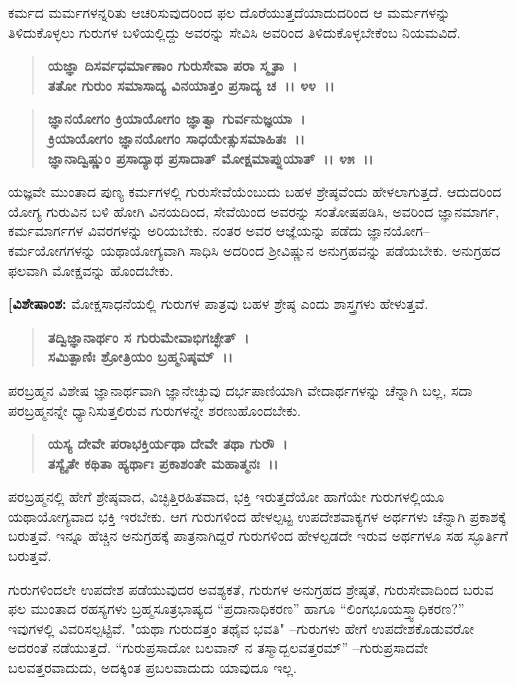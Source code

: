 ಕರ್ಮದ ಮರ್ಮಗಳನ್ನರಿತು ಆಚರಿಸುವುದರಿಂದ ಫಲ ದೊರೆಯುತ್ತದೆಯಾದುದರಿಂದ ಆ ಮರ್ಮಗಳನ್ನು ತಿಳಿದುಕೊಳ್ಳಲು ಗುರುಗಳ ಬಳಿಯಲ್ಲಿದ್ದು ಅವರನ್ನು ಸೇವಿಸಿ ಅವರಿಂದ ತಿಳಿದುಕೊಳ್ಳಬೇಕೆಂಬ ನಿಯಮವಿದೆ.

\begin{verse}
\textbf{ಯಜ್ಞಾ ದಿಸರ್ವಧರ್ಮಾಣಾಂ ಗುರುಸೇವಾ ಪರಾ ಸ್ಮೃತಾ~।}\\\textbf{ತತೋ ಗುರುಂ ಸಮಾಸಾದ್ಯ ವಿನಯಾತ್ತಂ ಪ್ರಸಾದ್ಯ ಚ~।। ೪೪~।। }
\end{verse}

\begin{verse}
\textbf{ಜ್ಞಾನಯೋಗಂ ಕ್ರಿಯಾಯೋಗಂ ಜ್ಞಾತ್ವಾ ಗುರ್ವನುಜ್ಞಯಾ~।}\\\textbf{ಕ್ರಿಯಾಯೋಗಂ ಜ್ಞಾನಯೋಗಂ ಸಾಧಯೇತ್ಸುಸಮಾಹಿತಃ~।।}\\\textbf{ಜ್ಞಾನಾದ್ವಿಷ್ಣುಂ ಪ್ರಸಾದ್ಯಾಥ ಪ್ರಸಾದಾತ್ ಮೋಕ್ಷಮಾಪ್ನುಯಾತ್~।। ೪೫~।।}
\end{verse}

ಯಜ್ಞವೇ ಮುಂತಾದ ಪುಣ್ಯ ಕರ್ಮಗಳಲ್ಲಿ ಗುರುಸೇವೆಯೆಂಬುದು ಬಹಳ ಶ್ರೇಷ್ಠವೆಂದು ಹೇಳಲಾಗುತ್ತದೆ. ಆದುದರಿಂದ ಯೋಗ್ಯ ಗುರುವಿನ ಬಳಿ ಹೋಗಿ ವಿನಯದಿಂದ, ಸೇವೆಯಿಂದ ಅವರನ್ನು ಸಂತೋಷಪಡಿಸಿ, ಅವರಿಂದ ಜ್ಞಾನಮಾರ್ಗ, ಕರ್ಮಮಾರ್ಗಗಳ ವಿವರಗಳನ್ನು ಅರಿಯಬೇಕು. ನಂತರ ಅವರ ಆಜ್ಞೆಯನ್ನು ಪಡೆದು ಜ್ಞಾನಯೋಗ–ಕರ್ಮಯೋಗಗಳನ್ನು ಯಥಾಯೋಗ್ಯವಾಗಿ ಸಾಧಿಸಿ ಅದರಿಂದ ಶ‍್ರೀವಿಷ್ಣುನ ಅನುಗ್ರಹವನ್ನು ಪಡೆಯಬೇಕು. ಅನುಗ್ರಹದ ಫಲವಾಗಿ ಮೋಕ್ಷವನ್ನು ಹೊಂದಬೇಕು.

\textbf{[ವಿಶೇಷಾಂಶ: }ಮೋಕ್ಷಸಾಧನೆಯಲ್ಲಿ ಗುರುಗಳ ಪಾತ್ರವು ಬಹಳ ಶ್ರೇಷ್ಠ ಎಂದು ಶಾಸ್ತ್ರಗಳು ಹೇಳುತ್ತವೆ.

\begin{verse}
\textbf{ತದ್ವಿಜ್ಞಾನಾರ್ಥಂ ಸ ಗುರುಮೇವಾಭಿಗಚ್ಛೇತ್~।}\\\textbf{ಸಮಿತ್ಪಾಣಿಃ ಶ್ರೋತ್ರಿಯಂ ಬ್ರಹ್ಮನಿಷ್ಠಮ್~।।} 
\end{verse}

ಪರಬ್ರಹ್ಮನ ವಿಶೇಷ ಜ್ಞಾನಾರ್ಥವಾಗಿ ಜ್ಞಾನೇಚ್ಛುವು ದರ್ಭಪಾಣಿಯಾಗಿ ವೇದಾರ್ಥಗಳನ್ನು ಚೆನ್ನಾಗಿ ಬಲ್ಲ, ಸದಾ ಪರಬ್ರಹ್ಮನನ್ನೇ ಧ್ಯಾನಿಸುತ್ತಲಿರುವ ಗುರುಗಳನ್ನೇ ಶರಣುಹೊಂದಬೇಕು.

\begin{verse}
\textbf{ಯಸ್ಯ ದೇವೇ ಪರಾಭಕ್ತಿರ್ಯಥಾ ದೇವೇ ತಥಾ ಗುರೌ~।}\\\textbf{ತಸ್ಯೈತೇ ಕಥಿತಾ ಹ್ಯರ್ಥಾಃ ಪ್ರಕಾಶಂತೇ ಮಹಾತ್ಮನಃ~।।} 
\end{verse}

ಪರಬ್ರಹ್ಮನಲ್ಲಿ ಹೇಗೆ ಶ್ರೇಷ್ಠವಾದ, ವಿಚ್ಛಿತ್ತಿರಹಿತವಾದ, ಭಕ್ತಿ ಇರುತ್ತದೆಯೋ ಹಾಗೆಯೇ ಗುರುಗಳಲ್ಲಿಯೂ ಯಥಾಯೋಗ್ಯವಾದ ಭಕ್ತಿ ಇರಬೇಕು. ಆಗ ಗುರುಗಳಿಂದ ಹೇಳಲ್ಪಟ್ಟ ಉಪದೇಶವಾಕ್ಯಗಳ ಅರ್ಥಗಳು ಚೆನ್ನಾಗಿ ಪ್ರಕಾಶಕ್ಕೆ ಬರುತ್ತವೆ. ಇನ್ನೂ ಹೆಚ್ಚಿನ ಅನುಗ್ರಹಕ್ಕೆ ಪಾತ್ರನಾಗಿದ್ದರೆ ಗುರುಗಳಿಂದ ಹೇಳಲ್ಪಡದೇ ಇರುವ ಅರ್ಥಗಳೂ ಸಹ ಸ್ಫೂರ್ತಿಗೆ ಬರುತ್ತವೆ.

ಗುರುಗಳಿಂದಲೇ ಉಪದೇಶ ಪಡೆಯುವುದರ ಅವಶ್ಯಕತೆ, ಗುರುಗಳ ಅನುಗ್ರಹದ ಶ್ರೇಷ್ಠತೆ, ಗುರುಸೇವಾದಿಂದ ಬರುವ ಫಲ ಮುಂತಾದ ರಹಸ್ಯಗಳು ಬ್ರಹ್ಮಸೂತ್ರಭಾಷ್ಯದ “ಪ್ರದಾನಾಧಿಕರಣ” ಹಾಗೂ “ಲಿಂಗಭೂಯಸ್ತ್ವಾಧಿಕರಣ?” ಇವುಗಳಲ್ಲಿ ವಿವರಿಸಲ್ಪಟ್ಟಿವೆ. "ಯಥಾ ಗುರುದತ್ತಂ ತಥೈವ ಭವತಿ" –ಗುರುಗಳು ಹೇಗೆ ಉಪದೇಶಕೊಡುವರೋ ಅದರಂತೆ ನಡೆಯುತ್ತದೆ. “ಗುರುಪ್ರಸಾದೋ ಬಲವಾನ್ ನ ತಸ್ಮಾದ್ಬಲವತ್ತರಮ್” –ಗುರುಪ್ರಸಾದವೇ ಬಲವತ್ತರವಾದುದು, ಅದಕ್ಕಿಂತ ಪ್ರಬಲವಾದುದು ಯಾವುದೂ ಇಲ್ಲ.

